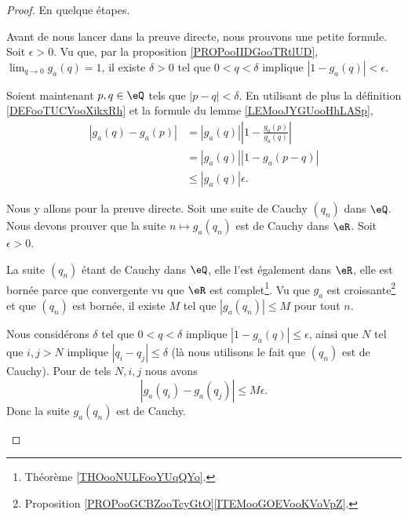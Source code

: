 \begin{proof}
	En quelque étapes.
	\begin{subproof}
		\spitem[Pour \( a>1\)]
		Avant de nous lancer dans la preuve directe, nous prouvons une petite formule. Soit \( \epsilon>0\). Vu que, par la proposition \ref{PROPooIIDGooTRtlUD}, \( \lim_{q\to 0} g_a(q)=1\), il existe \( \delta>0\) tel que \( 0<q<\delta\) implique \( | 1-g_a(q) |<\epsilon\).

		Soient maintenant \( p,q\in \eQ\) tels que \( | p-q |<\delta\). En utilisant de plus la définition \eqref{DEFooTUCVooXikxRh} et la formule du lemme \ref{LEMooJYGUooHhLASp},
		\begin{subequations}
			\begin{align}
				| g_a(q)-g_a(p) | & =| g_a(q) |\left| 1-\frac{ g_a(p) }{ g_a(q) } \right| \\
				                  & =| g_a(q) | | 1-g_a(p-q) |                            \\
				                  & \leq | g_a(q) |\epsilon.
			\end{align}
		\end{subequations}

		Nous y allons pour la preuve directe. Soit une suite de Cauchy \( (q_n)\) dans \( \eQ\). Nous devons prouver que la suite \( n\mapsto g_a(q_n)\) est de Cauchy dans \( \eR\). Soit \( \epsilon>0\).

		La suite \((q_n)\) étant de Cauchy dans \( \eQ\), elle l'est également dans \( \eR\), elle est bornée parce que convergente vu que \( \eR\) est complet\footnote{Théorème \ref{THOooNULFooYUqQYo}.}. Vu que \( g_a\) est croissante\footnote{Proposition \ref{PROPooGCBZooTcyGtO}\ref{ITEMooGOEVooKVoVpZ}.} et que \( (q_n)\) est bornée, il existe \( M\) tel que \( | g_a(q_n) |\leq M\) pour tout \( n\).

		Nous considérons \( \delta\) tel que \( 0<q<\delta\) implique \( | 1-g_a(q) |\leq \epsilon\), ainsi que \( N\) tel que \( i,j>N\) implique \( | q_i-q_j |\leq \delta\) (là nous utilisons le fait que \( (q_n)\) est de Cauchy). Pour de tels \( N, i,j\) nous avons
		\begin{equation}
			| g_a(q_i)-g_a(q_j) |\leq M\epsilon.
		\end{equation}
		Donc la suite \( g_a(q_n)\) est de Cauchy.


\end{subproof}
\end{proof}
